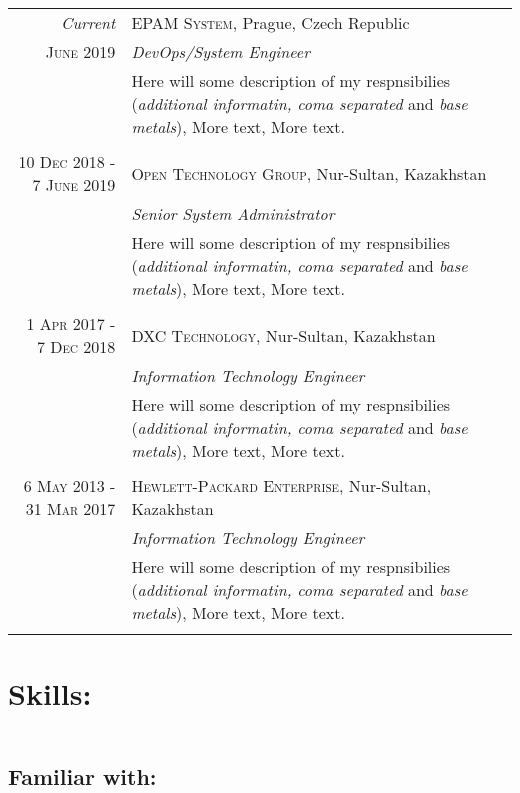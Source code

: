 \documentclass[a4paper,10pt]{article}
\begin{document}
\begin{tabular}{r|p{11cm}}
\emph{Current} & \textsc{EPAM System}, Prague, Czech Republic \\
\textsc{June 2019} & \emph{DevOps/System Engineer}\\ 
& \footnotesize{Here will some description of my respnsibilies (\textit{additional informatin, coma separated} and \textit{base metals}), More text, More text.}\\
\multicolumn{2}{c}{} \\
\textsc{10 Dec 2018 - 7 June 2019} & \textsc{Open Technology Group}, Nur-Sultan, Kazakhstan \\
                            & \emph{Senior System Administrator}\\
& \footnotesize{Here will some description of my respnsibilies (\textit{additional informatin, coma separated} and \textit{base metals}), More text, More text.}\\
\multicolumn{2}{c}{} \\
\textsc{1 Apr 2017 - 7 Dec 2018} & \textsc{DXC Technology}, Nur-Sultan, Kazakhstan \\
                            & \emph{Information Technology Engineer}\\
& \footnotesize{Here will some description of my respnsibilies (\textit{additional informatin, coma separated} and \textit{base metals}), More text, More text.}\\
\multicolumn{2}{c}{} \\
\textsc{6 May 2013 - 31 Mar 2017} & \textsc{Hewlett-Packard Enterprise}, Nur-Sultan, Kazakhstan \\
                            & \emph{Information Technology Engineer}\\
& \footnotesize{Here will some description of my respnsibilies (\textit{additional informatin, coma separated} and \textit{base metals}), More text, More text.}\\
\multicolumn{2}{c}{} \\

\end{tabular}
\section*{Skills:}
\begin{tabular}{r|p{11cm}}
\end{tabular}
\subsection*{Familiar with:}
\begin{tabular}{r|p{11cm}}
\end{tabular}
\end{document}
